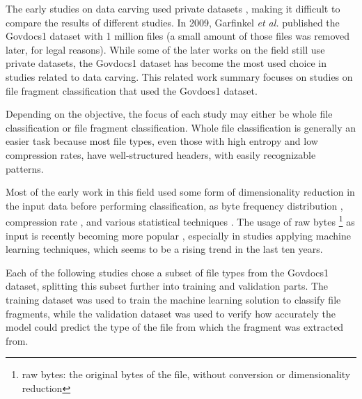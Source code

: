 The early studies on data carving used private datasets
\cite{karresand_file_2006} \cite{veenman_statistical_2007} \cite{erbacher_identification_2007} \cite{moody_sadi-statistical_2008} \cite{calhoun_predicting_2008} \cite{li_novel_2010} \cite{conti_automated_2010} \cite{kattan_gp-fileprints:_2010},
making it difficult to compare the results of different studies. In 2009, Garfinkel \textit{et al.} \cite{garfinkel_bringing_2009} published the Govdocs1 dataset with 1 million files (a small amount of those files was removed later, for legal reasons). While some of the later works on the field still use private datasets, the Govdocs1 dataset has become the most used choice in studies related to data carving. This related work summary focuses on studies on file fragment classification that used the Govdocs1 dataset.

Depending on the objective, the focus of each study may either be whole file classification or file fragment classification. Whole file classification is generally an easier task because most file types, even those with high entropy and low compression rates, have well-structured headers, with easily recognizable patterns.

Most of the early work in this field used some form of dimensionality reduction in the input data before performing classification, as byte frequency distribution 
\cite{karresand_oscarfile_2006} \cite{harris_using_2007} \cite{amirani_new_2008} \cite{ahmed_content-based_2010} \cite{ahmed_fast_2010} \cite{sportiello_context-based_2012} \cite{amirani_feature-based_2013} \cite{qiu_new_2014} \cite{maslim_distributed_2014} \cite{ali_classification_2018}, compression rate \cite{axelsson_normalised_2010} \cite{penrose_approaches_2013}, and various statistical techniques \cite{veenman_statistical_2007} \cite{erbacher_identification_2007} \cite{moody_sadi-statistical_2008} \cite{calhoun_predicting_2008} \cite{li_novel_2010} \cite{kattan_gp-fileprints:_2010} \cite{gopal_statistical_2011}. The usage of raw bytes \footnote{raw bytes: the original bytes of the file, without conversion or dimensionality reduction} as input is recently becoming more popular \cite{hiester_file_2018} \cite{chen_file_2018} \cite{wang_sparse_2018} \cite{wang_file_2018} \cite{vulinovic_neural_2019},
especially in studies applying machine learning techniques, which seems to be a rising trend in the last ten years.

Each of the following studies chose a subset of file types from the Govdocs1 dataset, splitting this subset further into training and validation parts. The training dataset was used to train the machine learning solution to classify file fragments, while the validation dataset was used to verify how accurately the model could predict the type of the file from which the fragment was extracted from.

